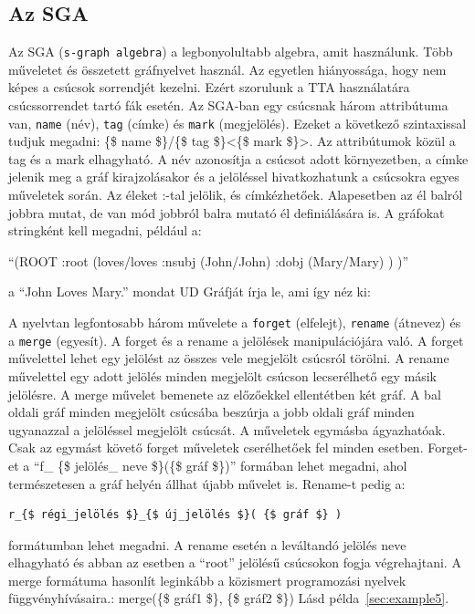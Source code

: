 \subsection{Az SGA}
\label{sec:sga}
Az SGA (\texttt{s-graph algebra}) a legbonyolultabb algebra, amit használunk. Több műveletet és összetett gráfnyelvet használ. Az egyetlen hiányossága, hogy nem képes a csúcsok sorrendjét kezelni. Ezért szorulunk a TTA használatára csúcssorrendet tartó fák esetén. Az SGA-ban egy csúcsnak három attribútuma van, \texttt{name} (név), \texttt{tag} (címke) és \texttt{mark} (megjelölés). Ezeket a következő szintaxissal tudjuk megadni: \{\$ name \$\}/\{\$ tag \$\}<\{\$ mark \$\}>. Az attribútumok közül a tag és a mark elhagyható. A név azonosítja a csúcsot adott környezetben, a címke jelenik meg a gráf kirajzolásakor és a jelöléssel hivatkozhatunk a csúcsokra egyes műveletek során. Az éleket :-tal jelölik, és címkézhetőek. Alapesetben az él balról jobbra mutat, de van mód jobbról balra mutató él definiálására is. A gráfokat stringként kell megadni, például a:

“(ROOT :root (loves/loves :nsubj (John/John) :dobj (Mary/Mary) ) )”

a “John Loves Mary.” mondat UD Gráfját írja le, ami így néz ki:


A nyelvtan legfontosabb három művelete a \texttt{forget} (elfelejt), \texttt{rename} (átnevez) és a \texttt{merge} (egyesít). A forget és a rename a jelölések manipulációjára való. A forget művelettel lehet egy jelölést az összes vele megjelölt csúcsról törölni. A rename művelettel egy adott jelölés minden megjelölt csúcson lecserélhető egy másik jelölésre. A merge művelet bemenete az előzőekkel ellentétben két gráf. A bal oldali gráf minden megjelölt csúcsába beszúrja a jobb oldali gráf minden ugyanazzal a jelöléssel megjelölt csúcsát. A műveletek egymásba ágyazhatóak. Csak az egymást követő forget műveletek cserélhetőek fel minden esetben. Forget-et a “f\_ \{\$ jelölés\_ neve \$\}(\{\$ gráf \$\})”
 formában lehet megadni, ahol természetesen a gráf helyén állhat újabb művelet is.  Rename-t pedig a:
\begin{verbatim}
r_{$ régi_jelölés $}_{$ új_jelölés $}( {$ gráf $} )
\end{verbatim}
formátumban lehet megadni. A rename esetén a leváltandó jelölés neve elhagyható és abban az esetben a “root” jelölésű csúcsokon fogja végrehajtani. A merge formátuma hasonlít leginkább a közismert programozási nyelvek függvényhívásaira.: merge(\{\$ gráf1 \$\}, \{\$ gráf2 \$\}) Lásd példa~\ref{sec:example5}.

